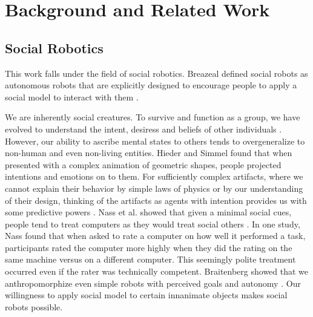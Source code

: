 \chapter{Background and Related Work}
\label{chap_background}







\section{Social Robotics}
This work falls under the field of social robotics. Breazeal defined social robots as autonomous robots that are explicitly designed to encourage people to apply a social model to interact with them \cite{breazeal_social_robots}.

We are inherently social creatures. To survive and function as a group, we have evolved to understand the intent, desiress and beliefs of other individuals \cite{lieberman_social}. However, our ability to ascribe mental states to others tends to overgeneralize to non-human and even non-living entities. Hieder and Simmel found that when presented with a complex animation of geometric shapes, people projected intentions and emotions on to them. For sufficiently complex artifacts, where we cannot explain their behavior by simple laws of physics or by our understanding of their design, thinking of the artifacts as agents with intention provides us with some predictive powers \cite{dennett_intentional_stance}. Nass et al. showed that given a minimal social cues, people tend to treat computers as they would treat social others \cite{nass_media_equation}. In one study, Nass found that when asked to rate a computer on how well it performed a task, participants rated the computer more highly when they did the rating on the same machine versus on a different computer. This seemingly polite treatment occurred even if the rater was technically competent. Braitenberg showed that we anthropomorphize even simple robots with perceived goals and autonomy \cite{braitenberg_vehicles}.  Our willingness to apply social model to certain innanimate objects makes social robots possible. 

